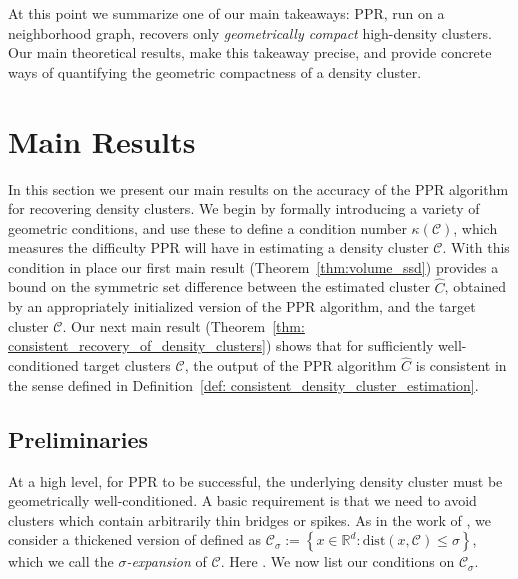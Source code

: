 \documentclass[11pt,twoside]{article}
\newcommand{\set}[1]{\left\{#1\right\}}
\newcommand{\Reals}{\mathbb{R}}
\newcommand{\norm}[1]{\left\lVert#1\right\rVert}
\newcommand{\1}{\mathbf{1}}
\newcommand{\dist}{\mathrm{dist}}
\newcommand{\Cbb}{\mathbb{C}}
\newcommand{\Cset}{\mathcal{C}}
\newcommand{\Csig}{\Cset_{\sigma}}
\newcommand{\Cest}{\widehat{C}}
\begin{document}
\noindent At this point we summarize one of our main takeaways: 
PPR, run on a neighborhood graph, recovers only \emph{geometrically
compact} high-density clusters. Our main theoretical results, make this takeaway 
precise, and provide concrete ways of quantifying the geometric
compactness of a density cluster. 

\section{Main Results}
\label{sec: consistent_cluster_estimation_with_ppr}
In this section we present our main results on the accuracy of the PPR algorithm 
for recovering density clusters. 
We begin by formally introducing a variety of geometric conditions, 
and use these to define a condition
number $\kappa(\Cset)$, which measures the difficulty PPR will have in  
estimating a density cluster $\Cset$.
With this condition in place 
our first main result (Theorem~\ref{thm:volume_ssd}) provides a bound
on the symmetric set difference between the estimated cluster $\Cest$,
obtained by an appropriately initialized version of the PPR algorithm,
and
the target cluster $\Cset$.
Our next main result (Theorem~\ref{thm: consistent_recovery_of_density_clusters})
shows that for sufficiently well-conditioned target clusters $\Cset$, the output 
of the PPR algorithm $\Cest$
is consistent in the sense defined in Definition~\ref{def: consistent_density_cluster_estimation}.

\subsection{Preliminaries}%
At a high level, for PPR
to be successful, the underlying density cluster must be geometrically
well-conditioned.  A basic requirement is that we need to avoid clusters which contain arbitrarily
thin bridges or spikes. As in the work of \citet{chaudhuri2010}, we consider a
thickened version of \smash{$\Cset \in \Cbb_f(\lambda)$} defined as 
$\Csig := \set{x \in \Reals^d: \dist(x,\Cset) \leq \sigma}$, which 
we call the \emph{$\sigma$-expansion} of $\Cset$. Here 
\smash{$\dist(x,\Cset) := \inf_{y \in \Cset} \norm{y - x}$}.  We now list our
conditions on $\Csig$.
\end{document}

